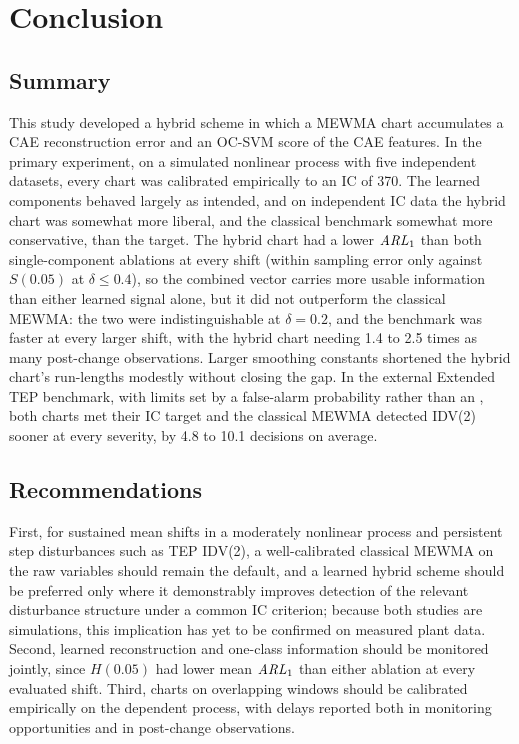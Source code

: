 \section{Conclusion}

\subsection{Summary}

This study developed a hybrid scheme in which a MEWMA chart accumulates a CAE reconstruction error and an OC-SVM score of the CAE features. In the primary experiment, on a simulated nonlinear process with five independent
datasets, every chart was calibrated empirically to an IC \ARL{} of 370. The learned components
behaved largely as intended, and on independent IC data the hybrid chart was somewhat more liberal,
and the classical benchmark somewhat more conservative, than the target. The hybrid chart had a lower $\mathit{ARL}_1$ than both single-component ablations at every shift (within sampling error only against
$S(0.05)$ at $\delta\le0.4$), so the combined vector carries more usable information than either
learned signal alone, but it did not outperform the classical MEWMA: the two were
indistinguishable at $\delta=0.2$, and the benchmark was faster at every larger shift, with the hybrid chart needing 1.4 to 2.5 times as many post-change observations. Larger smoothing constants
shortened the hybrid chart's run-lengths modestly without closing the gap. In the external Extended TEP benchmark, with limits set by a false-alarm probability rather than an \ARL{}, both charts met their IC target and the classical MEWMA detected IDV(2) sooner at every severity, by 4.8 to 10.1 decisions on average.

\subsection{Recommendations}

First, for sustained mean shifts in a moderately nonlinear process and persistent step disturbances
such as TEP IDV(2), a well-calibrated classical MEWMA on the raw variables should remain the default, and a learned hybrid scheme should be preferred only where it demonstrably improves detection of the relevant disturbance structure under a common IC criterion; because both studies are simulations, this implication has yet to be confirmed on measured plant data. Second,
learned reconstruction and one-class information should be monitored jointly, since $H(0.05)$ had lower mean $\mathit{ARL}_1$ than either ablation at every evaluated shift. Third, charts on overlapping windows should be
calibrated empirically on the dependent process, with delays reported both in monitoring
opportunities and in post-change observations.

